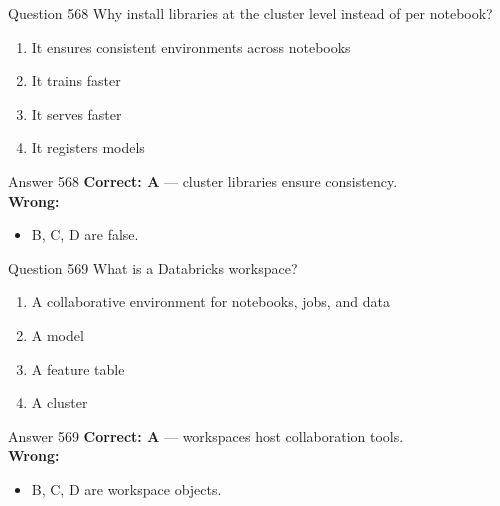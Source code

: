\documentclass[aspectratio=169,11pt]{beamer}
\begin{document}
	\begin{frame}{Question 568}
		Why install libraries at the cluster level instead of per notebook?
		\begin{enumerate}[label=\Alph*.]
			\item It ensures consistent environments across notebooks
			\item It trains faster
			\item It serves faster
			\item It registers models
		\end{enumerate}
	\end{frame}
	\begin{frame}{Answer 568}
		\textbf{Correct: A} --- cluster libraries ensure consistency.\\
		\vspace{0.5em}
		\textbf{Wrong:}
		\begin{itemize}
			\item B, C, D are false.
		\end{itemize}
	\end{frame}
	
	\begin{frame}{Question 569}
		What is a Databricks workspace?
		\begin{enumerate}[label=\Alph*.]
			\item A collaborative environment for notebooks, jobs, and data
			\item A model
			\item A feature table
			\item A cluster
		\end{enumerate}
	\end{frame}
	\begin{frame}{Answer 569}
		\textbf{Correct: A} --- workspaces host collaboration tools.\\
		\vspace{0.5em}
		\textbf{Wrong:}
		\begin{itemize}
			\item B, C, D are workspace objects.
		\end{itemize}
	\end{frame}
	
\end{document}
